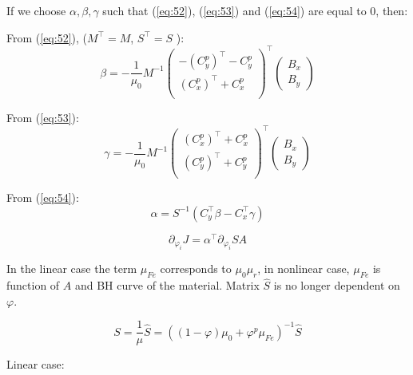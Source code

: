 \noindent If we choose $\alpha, \beta, \gamma$ such that  (\ref{eq:52}), (\ref{eq:53}) and (\ref{eq:54}) are equal to $0$, then: 

\noindent From (\ref{eq:52}), ($M^{\top} = M$, $S^{\top} = S$ ): 
\begin{equation} \label{eq:56} 
\beta = - \frac{1}{\mu_0} M^{-1} \begin{pmatrix} -\left(C_y^p\right)^{\top} -C_y^p \\ \left(C_x^p\right)^{\top} + C_x^p \\ \end{pmatrix}^{\top} \begin{pmatrix} B_x \\ B_y  \end{pmatrix}
\end{equation}

\noindent From (\ref{eq:53}): 
\begin{equation} \label{eq:57} 
\gamma = - \frac{1}{\mu_0} M^{-1} \begin{pmatrix} \left(C_x^p\right)^{\top} + C_x^p \\ \left(C_y^p\right)^{\top} + C_y^p \\ \end{pmatrix}^{\top} \begin{pmatrix} B_x \\ B_y \end{pmatrix}
\end{equation}

\noindent From (\ref{eq:54}): 
\begin{equation} \label{eq:58} 
\alpha =  S^{-1} \left( C_y^{\top} \beta - C_x^{\top} \gamma \right)
\end{equation}

\begin{equation} \label{eq:59} 
\partial_{\varphi_i} J = \alpha^{\top} \partial_{\varphi_i} S A 
\end{equation}

In the linear case the term $\mu_{Fe}$ corresponds to $\mu_0 \mu_r$, in nonlinear case, $\mu_{Fe}$ is function of $A$ and BH curve of the material. Matrix $\hat{S}$ is no longer dependent on $\varphi$.

\begin{equation} \label{eq:60} 
S = \frac{1}{\mu} \hat{S}  = \left(\left(1 - \varphi\right)\mu_0 + \varphi^p \mu_{Fe} \right)^{-1} \hat{S}
\end{equation}

\noindent Linear case:

